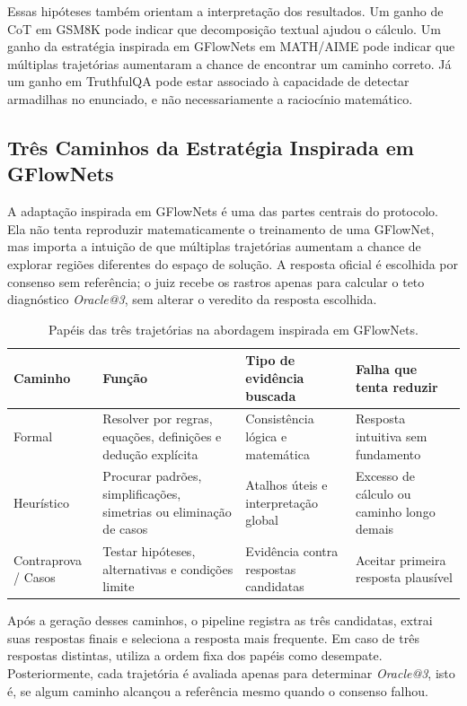 \documentclass[12pt]{article}
\begin{document}
Essas hipóteses também orientam a interpretação dos resultados. Um ganho de CoT em GSM8K pode indicar que decomposição textual ajudou o cálculo. Um ganho da estratégia inspirada em GFlowNets em MATH/AIME pode indicar que múltiplas trajetórias aumentaram a chance de encontrar um caminho correto. Já um ganho em TruthfulQA pode estar associado à capacidade de detectar armadilhas no enunciado, e não necessariamente a raciocínio matemático.

\subsection{Três Caminhos da Estratégia Inspirada em GFlowNets}

A adaptação inspirada em GFlowNets é uma das partes centrais do protocolo. Ela não tenta reproduzir matematicamente o treinamento de uma GFlowNet, mas importa a intuição de que múltiplas trajetórias aumentam a chance de explorar regiões diferentes do espaço de solução. A resposta oficial é escolhida por consenso sem referência; o juiz recebe os rastros apenas para calcular o teto diagnóstico \textit{Oracle@3}, sem alterar o veredito da resposta escolhida.

\begin{table}[H]
\centering
\small
\setlength{\tabcolsep}{3pt}
\renewcommand{\arraystretch}{1.15}
\caption{Papéis das três trajetórias na abordagem inspirada em GFlowNets.}
\label{tab:gflow_caminhos}
\begin{tabular}{|p{2.5cm}|p{4.1cm}|p{3.1cm}|p{2.8cm}|}
\hline
\textbf{Caminho} & \textbf{Função} & \textbf{Tipo de evidência buscada} & \textbf{Falha que tenta reduzir} \\
\hline
Formal & Resolver por regras, equações, definições e dedução explícita & Consistência lógica e matemática & Resposta intuitiva sem fundamento \\
\hline
Heurístico & Procurar padrões, simplificações, simetrias ou eliminação de casos & Atalhos úteis e interpretação global & Excesso de cálculo ou caminho longo demais \\
\hline
Contraprova / Casos & Testar hipóteses, alternativas e condições limite & Evidência contra respostas candidatas & Aceitar primeira resposta plausível \\
\hline
\end{tabular}
\end{table}
\FloatBarrier

Após a geração desses caminhos, o pipeline registra as três candidatas, extrai suas respostas finais e seleciona a resposta mais frequente. Em caso de três respostas distintas, utiliza a ordem fixa dos papéis como desempate. Posteriormente, cada trajetória é avaliada apenas para determinar \textit{Oracle@3}, isto é, se algum caminho alcançou a referência mesmo quando o consenso falhou.
\end{document}
